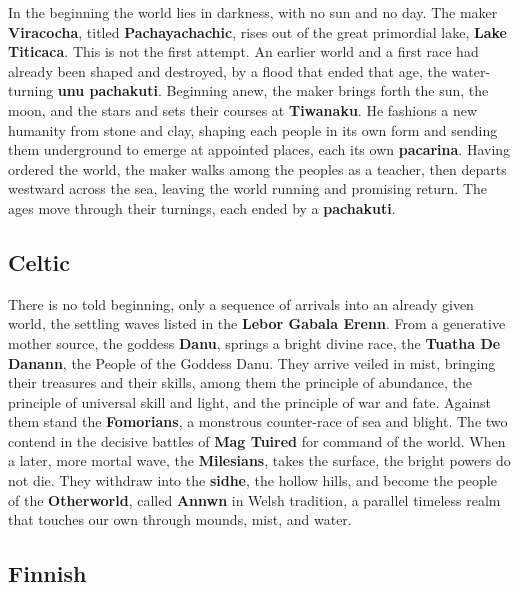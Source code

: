 In the beginning the world lies in darkness, with no sun and no day. The maker \textbf{Viracocha}, titled \textbf{Pachayachachic}, rises out of the great primordial lake, \textbf{Lake Titicaca}. This is not the first attempt. An earlier world and a first race had already been shaped and destroyed, by a flood that ended that age, the water-turning \textbf{unu pachakuti}. Beginning anew, the maker brings forth the sun, the moon, and the stars and sets their courses at \textbf{Tiwanaku}. He fashions a new humanity from stone and clay, shaping each people in its own form and sending them underground to emerge at appointed places, each its own \textbf{pacarina}. Having ordered the world, the maker walks among the peoples as a teacher, then departs westward across the sea, leaving the world running and promising return. The ages move through their turnings, each ended by a \textbf{pachakuti}.

\subsection{Celtic}

There is no told beginning, only a sequence of arrivals into an already given world, the settling waves listed in the \textbf{Lebor Gabala Erenn}. From a generative mother source, the goddess \textbf{Danu}, springs a bright divine race, the \textbf{Tuatha De Danann}, the People of the Goddess Danu. They arrive veiled in mist, bringing their treasures and their skills, among them the principle of abundance, the principle of universal skill and light, and the principle of war and fate. Against them stand the \textbf{Fomorians}, a monstrous counter-race of sea and blight. The two contend in the decisive battles of \textbf{Mag Tuired} for command of the world. When a later, more mortal wave, the \textbf{Milesians}, takes the surface, the bright powers do not die. They withdraw into the \textbf{sidhe}, the hollow hills, and become the people of the \textbf{Otherworld}, called \textbf{Annwn} in Welsh tradition, a parallel timeless realm that touches our own through mounds, mist, and water.

\subsection{Finnish}

